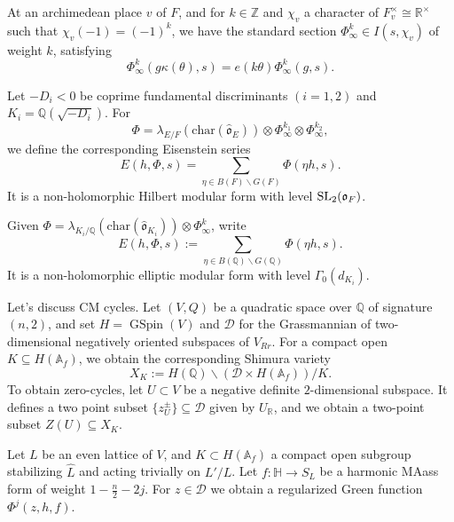 \documentclass[reqno]{amsart} 
\begin{document}
At an archimedean place $v$ of $F$, and for $k \in \mathbb{Z}$ and $\chi_v$ a character of $F_v^\times \cong \mathbb{R}^\times$ such that $\chi_v(-1) =(- 1)^k$, we have the standard section $\Phi_\infty^k  \in I(s, \chi_v)$ of weight $k$, satisfying
\begin{equation*}
  \Phi_\infty^k(g \kappa(\theta), s) = e(k \theta) \Phi_\infty^k(g, s).
\end{equation*}

Let $- D_i < 0$ be coprime fundamental discriminants $(i=1,2)$ and $K_i = \mathbb{Q}(\sqrt{- D_i})$.  For
\begin{equation*}
  \Phi = \lambda_{E/F} \left( \mathrm{char}(\hat{\mathfrak{o}}_E) \right) \otimes \Phi_\infty^{k_1} \otimes \Phi_\infty^{k_2},
\end{equation*}
we define the corresponding Eisenstein series
\begin{equation*}
  E(h, \Phi, s) = \sum_{\eta \in B(F) \backslash G(F)} \Phi(\eta h, s).
\end{equation*}
It is a non-holomorphic Hilbert modular form with level $\operatorname{SL}_2(\mathfrak{o}_F)$.

Given $\Phi = \lambda_{K_i / \mathbb{Q}}(\mathrm{char}(\hat{\mathfrak{o}}_{K_i})) \otimes \Phi_\infty^k$, write
\begin{equation*}
  E(h, \Phi, s) := \sum_{\eta \in B(\mathbb{Q}) \backslash G(\mathbb{Q})}
  \Phi(\eta h, s).
\end{equation*}
It is a non-holomorphic elliptic modular form with level $\Gamma_0(d_{K_i})$.

Let's discuss CM cycles.  Let $(V, Q)$ be a quadratic space over $\mathbb{Q}$ of signature $(n, 2)$, and set $H = \operatorname{GSpin}(V)$ and $\mathcal{D}$ for the Grassmannian of two-dimensional negatively oriented subspaces of $V_{Rr}$.  For a compact open $K \subseteq H(\mathbb{A}_f)$, we obtain the corresponding Shimura variety
\begin{equation*}
  X_K := H(\mathbb{Q}) \backslash(\mathcal{D} \times H(\mathbb{A}_f) )/K .
\end{equation*}
To obtain zero-cycles, let $U \subset V$ be a negative definite $2$-dimensional subspace.  It defines a two point subset $\{z_U^{\pm }\} \subseteq \mathcal{D}$ given by $U_{\mathbb{R}}$, and we obtain a two-point subset $Z(U) \subseteq X_K$.

Let $L$ be an even lattice of $V$, and $K \subset H(\mathbb{A}_f)$ a compact open subgroup stabilizing $\hat{L}$ and acting trivially on $L ' / L$.  Let $f : \mathbb{H} \rightarrow S_L$ be a harmonic MAass form of weight $1 - \tfrac{n}{2} - 2 j$.  For $z \in \mathcal{D}$ we obtain a regularized Green function $\Phi^j(z, h, f)$.
\end{document}
